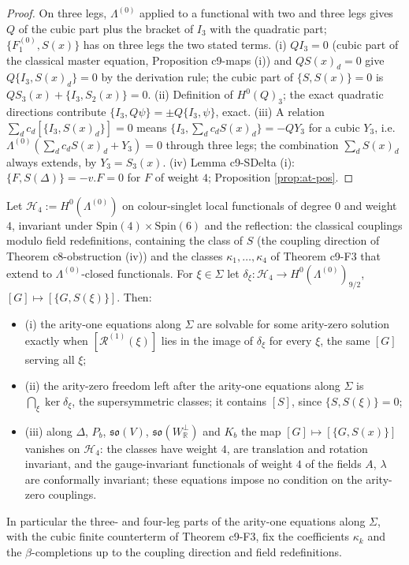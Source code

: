 \begin{proof}
On three legs, $\Lambda^{(0)}$ applied to a functional with two and three legs gives $Q$ of the cubic part plus the bracket of $I_3$ with the quadratic part; $\{F_1^{(0)},S(x)\}$ has on three legs the two stated terms. (i) $QI_3=0$ (cubic part of the classical master equation, Proposition c9-maps (i)) and $QS(x)_d=0$ give $Q\{I_3,S(x)_d\}=0$ by the derivation rule; the cubic part of $\{S,S(x)\}=0$ is $QS_3(x)+\{I_3,S_2(x)\}=0$. (ii) Definition of $H^0(Q)_3$; the exact quadratic directions contribute $\{I_3,Q\psi\}=\pm Q\{I_3,\psi\}$, exact. (iii) A relation $\sum_dc_d[\{I_3,S(x)_d\}]=0$ means $\{I_3,\sum_dc_dS(x)_d\}=-QY_3$ for a cubic $Y_3$, i.e. $\Lambda^{(0)}(\sum_dc_dS(x)_d+Y_3)=0$ through three legs; the combination $\sum_dS(x)_d$ always extends, by $Y_3=S_3(x)$. (iv) Lemma c9-SDelta (i): $\{F,S(\Delta)\}=-v.F=0$ for $F$ of weight $4$; Proposition \ref{prop:at-pos}.
\end{proof}

\begin{proposition}
\label{prop:at-couplings}
Let $\mathcal H_4:=H^0(\Lambda^{(0)})$ on colour-singlet local functionals of degree $0$ and weight $4$, invariant under $\mathrm{Spin}(4)\times\mathrm{Spin}(6)$ and the reflection: the classical couplings modulo field redefinitions, containing the class of $S$ (the coupling direction of Theorem c8-obstruction (iv)) and the classes $\kappa_1,\dots,\kappa_4$ of Theorem c9-F3 that extend to $\Lambda^{(0)}$-closed functionals. For $\xi\in\Sigma$ let $\delta_\xi:\mathcal H_4\to H^0(\Lambda^{(0)})_{9/2}$, $[G]\mapsto[\{G,S(\xi)\}]$. Then:
\begin{itemize}
\item (i) the arity-one equations along $\Sigma$ are solvable for some arity-zero solution exactly when $[\mathcal R^{(1)}(\xi)]$ lies in the image of $\delta_\xi$ for every $\xi$, the same $[G]$ serving all $\xi$;
\item (ii) the arity-zero freedom left after the arity-one equations along $\Sigma$ is $\bigcap_\xi\ker\delta_\xi$, the supersymmetric classes; it contains $[S]$, since $\{S,S(\xi)\}=0$;
\item (iii) along $\Delta$, $P_b$, $\mathfrak{so}(V)$, $\mathfrak{so}(W^\perp_{\mathbb R})$ and $K_b$ the map $[G]\mapsto[\{G,S(x)\}]$ vanishes on $\mathcal H_4$: the classes have weight $4$, are translation and rotation invariant, and the gauge-invariant functionals of weight $4$ of the fields $A$, $\lambda$ are conformally invariant; these equations impose no condition on the arity-zero couplings.
\end{itemize}
In particular the three- and four-leg parts of the arity-one equations along $\Sigma$, with the cubic finite counterterm of Theorem c9-F3, fix the coefficients $\kappa_k$ and the $\beta$-completions up to the coupling direction and field redefinitions.
\end{proposition}

